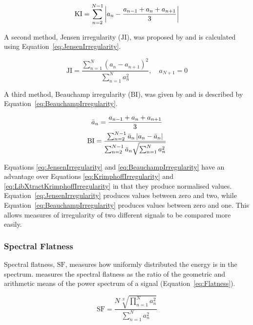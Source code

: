 			\begin{equation}
				\mathrm{KI} = \sum_{n = 2}^{N - 1}
						  \left|a_{n} - \frac{a_{n-1} + a_{n} + a_{n+1}}{3}\right|
				\label{eq:LibXtractKrimphoffIrregularity}
			\end{equation}

			A second method, Jensen irregularity ($\mathrm{JI}$), was proposed by \citet{jensen1999timbre} and
			is calculated using Equation~\ref{eq:JensenIrregularity}.

			\begin{equation}
				\mathrm{JI} = \frac{\sum_{n = 1}^{N} (a_{n} - a_{n+1})^{2}}
						   {\sum_{n = 1}^{N} a_{n}^{2}},
					      \quad a_{N+1} = 0
				\label{eq:JensenIrregularity}
			\end{equation}

			A third method, Beauchamp irregularity ($\mathrm{BI}$), was given by \citet{beauchamp2007analysis}
			and is described by Equation~\ref{eq:BeauchampIrregularity}.

			\begin{gather}
			        \bar{a}_{n} = \frac{a_{n-1} + a_{n} + a_{n+1}}{3} \nonumber \\
				\mathrm{BI} = \frac{\sum_{n = 2}^{N - 1} \bar{a}_{n} \left|a_{n} - \bar{a}_{n}\right|}
						   {\sum_{n = 2}^{N - 1} \bar{a}_{n} \sqrt{\sum_{n = 1}^{N} a_{n}^{2}}}
				\label{eq:BeauchampIrregularity}
			\end{gather}

			Equations \ref{eq:JensenIrregularity} and \ref{eq:BeauchampIrregularity} have an advantage over
			Equations \ref{eq:KrimphoffIrregularity} and \ref{eq:LibXtractKrimphoffIrregularity} in that they
			produce normalised values. Equation~\ref{eq:JensenIrregularity} produces values between zero and
			two, while Equation~\ref{eq:BeauchampIrregularity} produces values between zero and one. This
			allows measures of irregularity of two different signals to be compared more easily.

		\subsubsection*{Spectral Flatness}
			Spectral flatness, $\mathrm{SF}$, measures how uniformly distributed the energy is in the spectrum.
			\citet{johnston1988transform} measures the spectral flatness as the ratio of the geometric and
			arithmetic means of the power spectrum of a signal (Equation~\ref{eq:Flatness}).

			\begin{equation}
				\mathrm{SF} = \frac{N\sqrt[N]{\prod_{n = 1}^{N} a_{n}^{2}}}
						   {\sum_{n = 1}^{N} a_{n}^{2}}
				\label{eq:Flatness}
			\end{equation}


